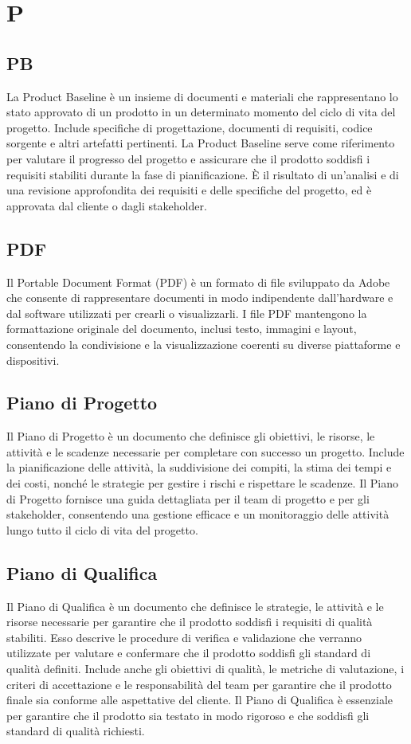 \section{P} 
\subsection{PB} 
La Product Baseline è un insieme di documenti e materiali che rappresentano lo stato approvato di un prodotto in un determinato momento del ciclo di vita del progetto. Include specifiche di progettazione, documenti di requisiti, codice sorgente e altri artefatti pertinenti. La Product Baseline serve come riferimento per valutare il progresso del progetto e assicurare che il prodotto soddisfi i requisiti stabiliti durante la fase di pianificazione. È il risultato di un'analisi e di una revisione approfondita dei requisiti e delle specifiche del progetto, ed è approvata dal cliente o dagli stakeholder.
\subsection{PDF} 
Il Portable Document Format (PDF) è un formato di file sviluppato da Adobe che consente di rappresentare documenti in modo indipendente dall'hardware e dal software utilizzati per crearli o visualizzarli. I file PDF mantengono la formattazione originale del documento, inclusi testo, immagini e layout, consentendo la condivisione e la visualizzazione coerenti su diverse piattaforme e dispositivi. 
\subsection{Piano di Progetto} 
Il Piano di Progetto è un documento che definisce gli obiettivi, le risorse, le attività e le scadenze necessarie per completare con successo un progetto. Include la pianificazione delle attività, la suddivisione dei compiti, la stima dei tempi e dei costi, nonché le strategie per gestire i rischi e rispettare le scadenze. Il Piano di Progetto fornisce una guida dettagliata per il team di progetto e per gli stakeholder, consentendo una gestione efficace e un monitoraggio delle attività lungo tutto il ciclo di vita del progetto. 
\subsection{Piano di Qualifica} 
Il Piano di Qualifica è un documento che definisce le strategie, le attività e le risorse necessarie per garantire che il prodotto soddisfi i requisiti di qualità stabiliti. Esso descrive le procedure di verifica e validazione che verranno utilizzate per valutare e confermare che il prodotto soddisfi gli standard di qualità definiti. Include anche gli obiettivi di qualità, le metriche di valutazione, i criteri di accettazione e le responsabilità del team per garantire che il prodotto finale sia conforme alle aspettative del cliente. Il Piano di Qualifica è essenziale per garantire che il prodotto sia testato in modo rigoroso e che soddisfi gli standard di qualità richiesti. 
